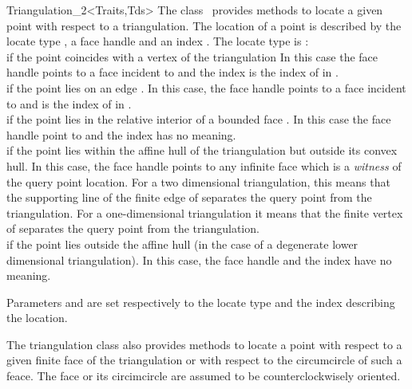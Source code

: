 \begin{ccClassTemplate}{Triangulation_2<Traits,Tds>}
The class \ccClassTemplateName\  provides methods to locate
a given point with respect to a triangulation. The location of a point 
is described  by the locate type , a face handle  and
an index . The locate type is : \\
 if the point coincides with a vertex  of the triangulation
 In this case the face handle  points to a face incident to 
and the index  is the index of   in .\\
 if the point lies on an edge . In this case, the face
handle 
points to a face incident to  and   is the
index of  in . \\
 if the point lies in the relative interior of a bounded
face . In this case the face handle point to  and the
index 
has no meaning. \\
 if the point lies within the affine hull of
the triangulation but outside its convex hull. In this case, 
the face handle  points to any infinite face which is a {\em
witness } of the
query point location. For a two dimensional triangulation, this means
that the supporting line of the finite edge of   separates
the query point from the triangulation. For a one-dimensional
triangulation
it means that the 
finite vertex of   separates
the query point from the triangulation. \\
 if the point lies outside the affine hull
(in the case of a degenerate lower dimensional triangulation). In this 
case, the face
handle  and  the index  have no meaning.





{Parameters  and  are set respectively
to the locate type and the index describing the location.}
  

The triangulation class also provides
methods to locate a point with respect to
a given  finite face of the triangulation or with respect to the
circumcircle of such a feace.
The face or its circimcircle are assumed to be counterclockwisely
oriented.

{}


\end{ccClassTemplate}
